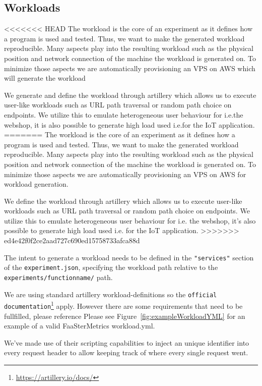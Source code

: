 \documentclass[../main.tex]{subfiles}
\begin{document}
\subsection{Workloads}\label{sec:WorkloadsStructure}

<<<<<<< HEAD
The workload is the core of an experiment as it defines how a program is used and tested. 
Thus, we want to make the generated workload reproducible. 
Many aspects play into the resulting workload such as the physical position and network connection of the machine the workload is generated on. 
To minimize those aspects we are automatically provisioning an VPS on AWS which will generate the workload

We generate and define the workload through artillery which allows us to execute user-like workloads 
such as URL path traversal or random path choice on endpoints. 
We utilize this to emulate heterogeneous user behaviour for i.e.\@ the webshop, 
it is also possible to generate high load used i.e.\@ for the IoT application.
=======
The workload is the core of an experiment as it defines how a program is used and tested. Thus, we want to make the generated workload reproducible. Many aspects play into the resulting workload such as the physical position and network connection of the machine the workload is generated on. To minimize those aspects we are automatically provisioning an VPS on AWS for workload generation.

We define the workload through artillery which allows us to execute user-like workloads such as URL path traversal or random path choice on endpoints. We utilize this to emulate heterogeneous user behaviour for i.e. the webshop, it's also possible to generate high load used i.e. for the IoT application.
>>>>>>> ed4e42f0f2ce2aad727c690ed15758733afca88d

The intent to generate a workload needs to be defined in the \texttt{"services"} section of the \texttt{experiment.json}, specifying the workload path relative to the \texttt{experiments/functionname/} path. %

We are using standard artillery workload-definitions so the \texttt{official documentation}\footnote{\url{https://artillery.io/docs/}} apply. However there are some requirements that need to be fullfilled, please reference %
Please see Figure~\ref{fig:exampleWorkloadYML} for an example of a valid FaaSterMetrics workload.yml.

We've made use of their scripting capabilities to inject an unique identifier into every request header to allow keeping track of where every single request went. 
\end{document}
